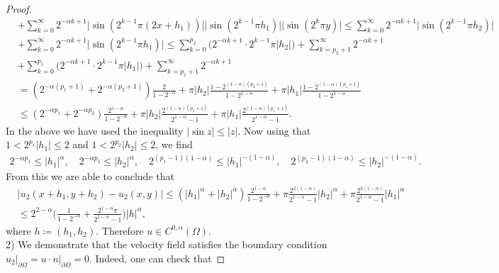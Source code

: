 \documentclass[12pt,a4paper]{article}
\theoremstyle{definition}
\theoremstyle{remark}
\numberwithin{equation}{section}
\begin{document}
\begin{proof}
\begin{align*}
&+ \sum_{k=0}^\infty 2^{-\alpha k + 1} \lvert \sin ( 2^{k-1} \pi (2 x + h_1) ) \rvert \lvert \sin ( 2^{k-1} \pi h_1) \rvert \lvert \sin (2^k \pi y) \rvert \leq \sum_{k=0}^\infty 2^{-\alpha k + 1} \lvert \sin ( 2^{k-1} \pi h_2) \rvert \\
&+ \sum_{k=0}^\infty 2^{-\alpha k + 1} \lvert \sin ( 2^{k-1} \pi h_1) \rvert \leq \sum_{k=0}^{p_2} \bigg( 2^{-\alpha k + 1} \cdot 2^{k-1} \pi \lvert h_2 \rvert \bigg) + \sum_{k=p_2+1}^\infty 2^{-\alpha k + 1} \\
&+ \sum_{k=0}^{p_1} \bigg( 2^{-\alpha k + 1} \cdot 2^{k-1} \pi \lvert h_1 \rvert \bigg) + \sum_{k=p_1 + 1}^\infty 2^{-\alpha k + 1} \\
&= (2^{-\alpha (p_1 + 1) } + 2^{-\alpha (p_2 + 1) } ) \frac{2}{1 - 2^{-\alpha}} + \pi \lvert h_2 \rvert \frac{1 - 2^{(1 - \alpha) (p_2 + 1)}}{1 - 2^{1 - \alpha}} + \pi \lvert h_1 \rvert \frac{1 - 2^{(1 - \alpha) (p_1 + 1)}}{1 - 2^{1 - \alpha}} \\
&\leq (2^{-\alpha p_1  } + 2^{-\alpha p_2  } ) \frac{2^{1 - \alpha}}{1 - 2^{-\alpha}} + \pi \lvert h_2 \rvert \frac{2^{(1 - \alpha) (p_2 + 1)}}{2^{1 - \alpha} - 1} + \pi \lvert h_1 \rvert \frac{2^{(1 - \alpha) (p_1 + 1)}}{2^{1 - \alpha} - 1}.
\end{align*}
\endgroup
In the above we have used the inequality $|\sin z| \le |z|$. Now using that $1 < 2^{p_1} \lvert h_1 \rvert \leq 2$ and $1 < 2^{p_2} \lvert h_2 \rvert \leq 2$, we find
\begin{align*}
2^{-\alpha p_1} \leq \lvert h_1 \rvert^{\alpha}, \quad 2^{-\alpha p_2} \leq \lvert h_2 \rvert^{\alpha}, \quad 2^{(p_1 - 1)(1 - \alpha)} \leq \lvert h_1 \rvert^{- (1 - \alpha)}, \quad 2^{(p_2 - 1)(1 - \alpha)} \leq \lvert h_2 \rvert^{- (1 - \alpha)}.
\end{align*}
From this we are able to conclude that
\begin{align*}
&\lvert u_{2}(x+h_1, y+h_2) - u_{2}(x,y) \rvert \leq (\lvert h_1 \rvert^{\alpha} + \lvert h_2 \rvert^{\alpha} ) \frac{2^{1 - \alpha}}{1 - 2^{-\alpha}} + \pi \frac{2^{2 (1 - \alpha) }}{2^{1 - \alpha} - 1} \lvert h_2 \rvert^\alpha + \pi \frac{2^{2 (1 - \alpha) }}{2^{1 - \alpha} - 1} \lvert h_1 \rvert^\alpha \\
&\leq 2^{2 - \alpha} \bigg( \frac{1}{1 - 2^{-\alpha}} + \frac{2^{1 - \alpha } \pi }{2^{1 - \alpha} - 1} \bigg) \lvert h \rvert^{\alpha},
\end{align*}
where $h \coloneqq (h_1, h_2)$. Therefore $u \in C^{0,\alpha} (\Omega)$.\\
2) We demonstrate that the velocity field satisfies the boundary condition $u_2 \lvert_{\partial \Omega} =u\cdot n \lvert_{\partial \Omega} =0$. Indeed, one can check that 

\end{proof}
\end{document}
